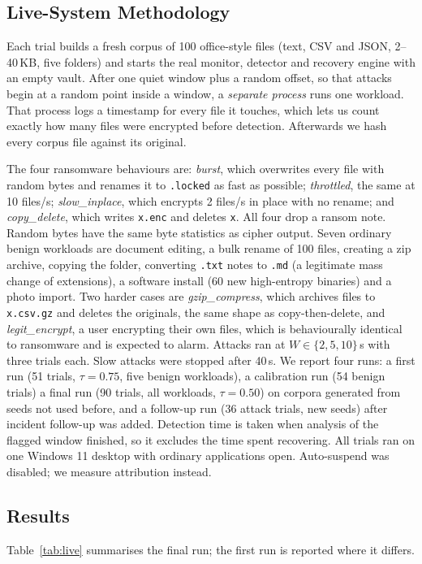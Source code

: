 \documentclass[conference]{IEEEtran}
\begin{document}
\subsection{Live-System Methodology}
Each trial builds a fresh corpus of 100 office-style files (text, CSV and JSON, 2--40\,KB, five folders) and starts the real monitor, detector and recovery engine with an empty vault. After one quiet window plus a random offset, so that attacks begin at a random point inside a window, a \emph{separate process} runs one workload. That process logs a timestamp for every file it touches, which lets us count exactly how many files were encrypted before detection. Afterwards we hash every corpus file against its original.

The four ransomware behaviours are: \emph{burst}, which overwrites every file with random bytes and renames it to \texttt{.locked} as fast as possible; \emph{throttled}, the same at 10 files/s; \emph{slow\_inplace}, which encrypts 2 files/s in place with no rename; and \emph{copy\_delete}, which writes \texttt{x.enc} and deletes \texttt{x}. All four drop a ransom note. Random bytes have the same byte statistics as cipher output. Seven ordinary benign workloads are document editing, a bulk rename of 100 files, creating a zip archive, copying the folder, converting \texttt{.txt} notes to \texttt{.md} (a legitimate mass change of extensions), a software install (60 new high-entropy binaries) and a photo import. Two harder cases are \emph{gzip\_compress}, which archives files to \texttt{x.csv.gz} and deletes the originals, the same shape as copy-then-delete, and \emph{legit\_encrypt}, a user encrypting their own files, which is behaviourally identical to ransomware and is expected to alarm. Attacks ran at $W \in \{2, 5, 10\}$\,s with three trials each. Slow attacks were stopped after 40\,s. We report four runs: a first run (51 trials, $\tau = 0.75$, five benign workloads), a calibration run (54 benign trials) a final run (90 trials, all workloads, $\tau = 0.50$) on corpora generated from seeds not used before, and a follow-up run (36 attack trials, new seeds) after incident follow-up was added. Detection time is taken when analysis of the flagged window finished, so it excludes the time spent recovering. All trials ran on one Windows 11 desktop with ordinary applications open. Auto-suspend was disabled; we measure attribution instead.

\subsection{Results}
Table~\ref{tab:live} summarises the final run; the first run is reported where it differs.
\end{document}
